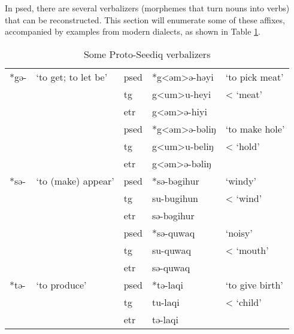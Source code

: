 In \acl{psed}, there are several verbalizers (morphemes that turn nouns into verbs) that can be reconstructed. This section will enumerate some of these affixes, accompanied by examples from modern dialects, as shown in Table \ref{tab:psed_vblz}. 

\begingroup
{}
\renewcommand\arraystretch{1.2}
\begin{table}[!htbp]
\centering
\caption{Some Proto-Seediq verbalizers}
\label{tab:psed_vblz}
\begin{tabular}{lllll}
\hline
*gə-       & `to get; to let be'       & \ac{psed} & *g<əm>ə-həyi    & `to pick meat'                 \\
     &                    & \ac{tg}   & g<um>u-heyi      & \quad < `meat'                           \\
     &                    & \ac{etr}  & g<əm>ə-hiyi      &                            \\ \cline{3-5} 
     &                    & \ac{psed} & *g<əm>ə-bəliŋ    & `to make hole'             \\
     &                    & \ac{tg}   & g<um>u-beliŋ     & \quad < `hold'                           \\
     &                    & \ac{etr}  & g<əm>ə-bəliŋ     &                            \\ \hline
*sə- & `to (make) appear' & \ac{psed} & *sə-bəgihur      & `windy'                    \\
     &                    & \ac{tg}   & su-bugihun       & \quad < `wind'                           \\
     &                    & \ac{etr}  & sə-bəgihur       &                            \\ \cline{3-5} 
     &                    & \ac{psed} & *sə-quwaq        & `noisy'                    \\
     &                    & \ac{tg}   & su-quwaq         & \quad < `mouth'                          \\
     &                    & \ac{etr}  & sə-quwaq         &                            \\ \hline
*tə- & `to produce'       & \ac{psed} & *tə-laqi         & `to give birth'            \\
     &                    & \ac{tg}   & tu-laqi          & \quad < `child'                           \\
     &                    & \ac{etr}  & tə-laqi          &                            \\ \cline{3-5} 

\end{tabular}
\end{table}
